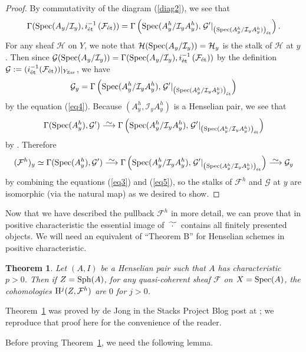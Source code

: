 \documentclass[12pt]{article}
\newcommand\simto{\stackrel{\textstyle\sim}{\smash{\longrightarrow}\rule{0pt}{0.4ex}}}
\newcommand{\F}{\mathcal{F}}
\newcommand{\G}{\mathcal{G}}
\newcommand{\spec}{{\rm Spec}}
\newcommand{\sph}{{\rm Sph}}
\newcommand{\mc}[1]{\mathcal{#1}}
\newcommand{\et}{{\rm\acute{e}t}}
\newcommand{\zar}{{\rm Zar}}
\renewcommand{\H}{{\rm H}}
\newcommand{\spcite}[2]{\cite[\href{https://stacks.math.columbia.edu/tag/#1}{{#2} {#1}}]{stackp}}
\newtheorem{theorem}{Theorem}[subsection]
\theoremstyle{definition}
\numberwithin{equation}{subsection}
\begin{document}
\begin{proof}
By commutativity of the diagram (\ref{diag2}), we see that \begin{equation}\label{eq4}\Gamma(\spec(A_y/\mc{I}_y), i_{\et}^{-1}\left(\F_{\et}\right)) = \Gamma\left(\spec(A_y^h/\mc{I}_yA_y^h),\left.\G'\right|_{\left(\spec(A_y^h/\mc{I}_yA_y^h)\right)_{\et}}\right).\end{equation} For any sheaf $\mc{H}$ on $Y$, we note that $\mc{H}(\spec(A_y/\mc{I}_y)) = \mc{H}_y$ is the stalk of $\mc{H}$ at $y$. Then since $\G(\spec(A_y/\mc{I}_y)) = \Gamma(\spec(A_y/\mc{I}_y), i_{\et}^{-1}\left(\F_{\et}\right))$ by the definition $\G:=(i_{\et}^{-1}(\F_{\et}))|_{Y_{\zar}}$, we have \begin{equation}\label{eq5} \G_y=\Gamma\left(\spec(A_y^h/\mc{I}_yA_y^h),\left.\G'\right|_{\left(\spec(A_y^h/\mc{I}_yA_y^h)\right)_{\et}}\right) \end{equation} by the equation (\ref{eq4}).
Because $(A_y^h,\mc{I}_yA_y^h)$ is a Henselian pair, we see that $$\Gamma(\spec(A_y^h),\G')\simto\Gamma\left(\spec(A_y^h/\mc{I}_yA_y^h),\left.\G'\right|_{\left(\spec(A_y^h/\mc{I}_yA_y^h)\right)_{\et}}\right)$$ by \spcite{09ZH}{Lemma}. Therefore $$ (\F^h)_y  \simeq \Gamma(\spec(A_y^h),\G') \simto \Gamma\left(\spec(A_y^h/\mc{I}_yA_y^h),\left.\G'\right|_{\left(\spec(A_y^h/\mc{I}_yA_y^h)\right)_{\et}}\right) \simto \G_y$$ by combining the equations (\ref{eq3}) and (\ref{eq5}), so the stalks of $\F^h$ and $\G$ at $y$ are isomorphic (via the natural map) as we desired to show.\end{proof}



Now that we have described the pullback $\F^h$ in more detail, we can prove that in positive characteristic the essential image of $\fwt$ contains all finitely presented objects. We will need an equivalent of ``Theorem B'' for Henselian schemes in positive characteristic.

\begin{theorem}\label{thm:thmbpos} Let $(A,I)$ be a Henselian pair such that $A$ has characteristic $p > 0$. Then if $Z=\sph(A)$, for any quasi-coherent sheaf $\F$ on $X=\spec(A)$, the cohomologies $\H^j(Z,\F^h)$ are $0$ for $j > 0$. 
\end{theorem}

Theorem~\ref{thm:thmbpos} was proved by de Jong in the Stacks Project Blog post at \cite{thmbblog}; we reproduce that proof here for the convenience of the reader.

Before proving Theorem~\ref{thm:thmbpos}, we need the following lemma.
\end{document}
